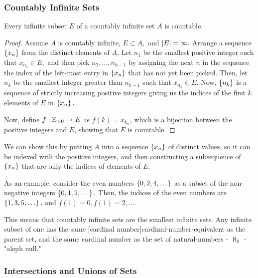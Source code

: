 \documentclass{article}
\begin{document}
\subsubsection{Countably Infinite Sets}

\begin{theorem}\label{infinite-subset-of-countable-is-countable}
Every \@{infinite} \@{subset} $E$ of a countably infinite set $A$ is \@{countable}.
\end{theorem}

\begin{proof}
Assume $A$ is countably infinite, $E \subset A,$ and $\left| E \right| = \infty.$ Arrange a \@{sequence} $\left\{ x_n \right\}$ from the distinct \@{elements} of $A$. Let $n_1$ be the smallest positive integer such that $x_{n_1} \in E,$ and then pick $n_2, \dots, n_{k-1}$ by assigning the next $n$ in the sequence the index of the left-most entry in $\left\{ x_n \right\}$ that has not yet been picked. Then, let $n_k$ be the smallest integer greater than $n_{k-1}$ such that $x_{n_k} \in E.$ Now, $\left\{ n_k \right\}$ is a sequence of strictly increasing positive integers giving us the indices of the first $k$ elements of $E$ in $\left\{ x_n \right\}.$

Now, define $f : \mathbb{Z}_{>0} \to E$ as $f(k) = {x_{k_n}}$, which is a bijection between the positive integers and $E$, showing that $E$ is \@{countable}.
\end{proof}

\begin{intuition}
We can show this by putting $A$ into a \@{sequence} $\left\{ x_n \right\}$ of distinct values, so it can be indexed with the positive integers, and then constructing a \@{subsequence} of $\left\{ x_n \right\}$ that are only the indices of elements of $E.$

As an example, consider the even numbers $\set{0, 2, 4, \dots}$ as a subset of the non-negative integers $\set{0, 1, 2, \dots}.$ Then, the indices of the even numbers are $\set{1, 3, 5, \dots},$ and $f(1) = 0, f(1) = 2, \dots.$
\end{intuition}

\begin{note}
This means that countably infinite sets are the smallest infinite sets. Any \@{infinite} subset of one has the same \@[cardinal number]{cardinal-number-equivalent} as the parent set, and the same cardinal number as the set of \@{natural-numbers} - $\aleph_0$ - "aleph null."
\end{note}

\subsubsection{Intersections and Unions of Sets}
\end{document}
